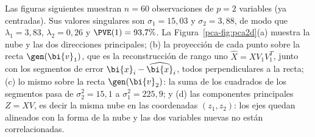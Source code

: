 Las figuras siguientes muestran $n=60$ observaciones de $p=2$ variables (ya
centradas). Sus valores singulares son $\sigma_1=15{,}03$ y $\sigma_2=3{,}88$, de
modo que $\lambda_1=3{,}83$, $\lambda_2=0{,}26$ y $\PVE(1)=93{,}7\%$.
La Figura~\ref{pca-fig:pca2d}(a) muestra la nube y las dos direcciones
principales; (b) la proyección de cada punto sobre la recta $\gen(\bi{v}_1)$, que
es la reconstrucción de rango uno $\widehat X=XV_1V_1^T$, junto con los
segmentos de error $\bi{x}_i-\widehat{\bi{x}}_i$, todos perpendiculares a la recta; (c)
lo mismo sobre la recta $\gen(\bi{v}_2)$: la suma de los cuadrados de los segmentos
pasa de $\sigma_2^2=15{,}1$ a $\sigma_1^2=225{,}9$; y (d) las componentes
principales $Z=XV$, es decir la misma nube en las coordenadas
$(z_1,z_2)$: los ejes quedan alineados con la forma de la nube y las dos
variables nuevas no están correlacionadas.

